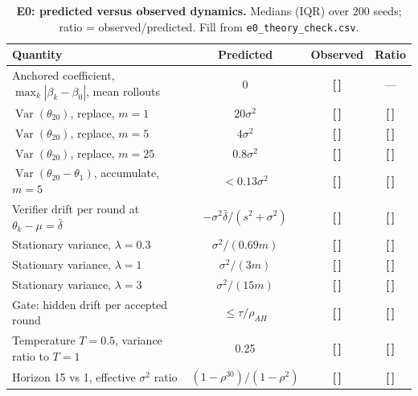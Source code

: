 \documentclass[11pt,a4paper]{article}
\newcommand{\Var}{\operatorname{Var}}
\newcommand{\T}{{\color{red}\textbf{[\,]}}}
\begin{document}
\begin{table}[!htbp]\centering\footnotesize
\caption{\textbf{E0: predicted versus observed dynamics.} Medians (IQR) over 200 seeds; ratio = observed/predicted. Fill from \texttt{e0\_theory\_check.csv}.}
\begin{tabularx}{\textwidth}{@{}Y c c c@{}}\toprule
Quantity & Predicted & Observed & Ratio\\\midrule
Anchored coefficient, $\max_k|\beta_k-\beta_0|$, mean rollouts & 0 & \T & ---\\
$\Var(\theta_{20})$, replace, $m=1$ & $20\sigma^2$ & \T & \T\\
$\Var(\theta_{20})$, replace, $m=5$ & $4\sigma^2$ & \T & \T\\
$\Var(\theta_{20})$, replace, $m=25$ & $0.8\sigma^2$ & \T & \T\\
$\Var(\theta_{20}-\theta_1)$, accumulate, $m=5$ & $<0.13\sigma^2$ & \T & \T\\
Verifier drift per round at $\theta_k-\mu=\bar\delta$ & $-\sigma^2\bar\delta/(s^2+\sigma^2)$ & \T & \T\\
Stationary variance, $\lambda=0.3$ & $\sigma^2/(0.69m)$ & \T & \T\\
Stationary variance, $\lambda=1$ & $\sigma^2/(3m)$ & \T & \T\\
Stationary variance, $\lambda=3$ & $\sigma^2/(15m)$ & \T & \T\\
Gate: hidden drift per accepted round & $\le\tau/\rho_{AH}$ & \T & \T\\
Temperature $T=0.5$, variance ratio to $T=1$ & 0.25 & \T & \T\\
Horizon 15 vs 1, effective $\sigma^2$ ratio & $(1-\rho^{30})/(1-\rho^{2})$ & \T & \T\\
\bottomrule\end{tabularx}
\end{table}
\FloatBarrier
\end{document}

